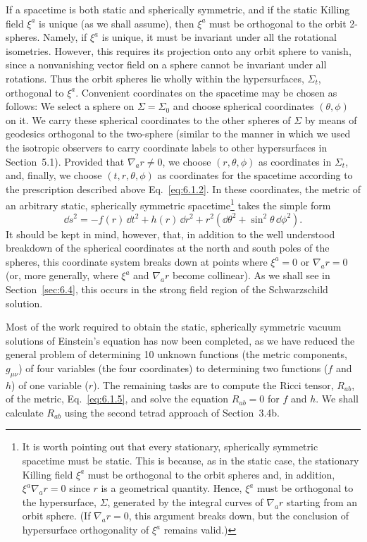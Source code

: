 If a spacetime is both static and spherically symmetric, and if the static
Killing field \(\xi^a\) is unique (as we shall assume), then \(\xi^a\) must be
orthogonal to the orbit 2-spheres. Namely, if \(\xi^a\) is unique, it must be
invariant under all the rotational isometries. However, this requires its
projection onto any orbit sphere to vanish, since a nonvanishing vector field on a
sphere cannot be invariant under all rotations. Thus the orbit spheres lie wholly
within the hypersurfaces, \(\Sigma_t\), orthogonal to \(\xi^a\). Convenient
coordinates on the spacetime may be chosen as follows: We select a sphere on
\(\Sigma=\Sigma_0\) and choose spherical coordinates \((\theta,\phi)\) on it. We
carry these spherical coordinates to the other spheres of \(\Sigma\) by means of
geodesics orthogonal to the two-sphere (similar to the manner in which we used the
isotropic observers to carry coordinate labels to other hypersurfaces in
Section~5.1). Provided that \(\nabla_a r\ne0\), we choose \((r,\theta,\phi)\) as
coordinates in \(\Sigma_t\), and, finally, we choose \((t,r,\theta,\phi)\) as
coordinates for the spacetime according to the prescription described above
Eq.~\eqref{eq:6.1.2}. In these coordinates, the metric of an arbitrary static,
spherically symmetric spacetime\footnote{It is worth pointing out that every
stationary, spherically symmetric spacetime must be static. This is because, as
in the static case, the stationary Killing field \(\xi^a\) must be orthogonal to
the orbit spheres and, in addition, \(\xi^a\nabla_a r=0\) since \(r\) is a
geometrical quantity. Hence, \(\xi^a\) must be orthogonal to the hypersurface,
\(\Sigma\), generated by the integral curves of \(\nabla_a r\) starting from an
orbit sphere. (If \(\nabla_a r=0\), this argument breaks down, but the conclusion
of hypersurface orthogonality of \(\xi^a\) remains valid.)} takes the simple form
\begin{equation}
  \dd s^2=-f(r)\,\dd t^2+h(r)\,\dd r^2+r^2(\dd\theta^2+\sin^2\theta\,\dd\phi^2).
  \tag{6.1.5}\label{eq:6.1.5}
\end{equation}
It should be kept in mind, however, that, in addition to the well understood
breakdown of the spherical coordinates at the north and south poles of the
spheres, this coordinate system breaks down at points where \(\xi^a=0\) or
\(\nabla_a r=0\) (or, more generally, where \(\xi^a\) and \(\nabla_a r\) become
collinear). As we shall see in Section~\ref{sec:6.4}, this occurs in the strong
field region of the Schwarzschild solution.

Most of the work required to obtain the static, spherically symmetric vacuum
solutions of Einstein's equation has now been completed, as we have reduced the
general problem of determining 10 unknown functions (the metric components,
\(g_{\mu\nu}\)) of four variables (the four coordinates) to determining two
functions (\(f\) and \(h\)) of one variable (\(r\)). The remaining tasks are to
compute the Ricci tensor, \(R_{ab}\), of the metric, Eq.~\eqref{eq:6.1.5}, and
solve the equation \(R_{ab}=0\) for \(f\) and \(h\). We shall calculate \(R_{ab}\)
using the second tetrad approach of Section~3.4b.

